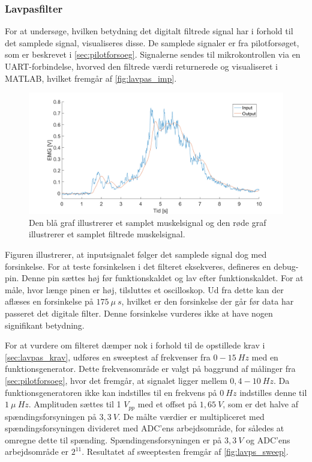 \subsubsection{Lavpasfilter} \label{sec:lavpas_test}
For at undersøge, hvilken betydning det digitalt filtrede signal har i forhold til det samplede signal, visualiseres disse. De samplede signaler er fra pilotforsøget, som er beskrevet i \autoref{sec:pilotforsoeg}. Signalerne sendes til mikrokontrollen via en UART-forbindelse, hvorved den filtrede værdi returnerede og visualiseret i MATLAB, hvilket fremgår af \autoref{fig:lavpas_imp}.

\begin{figure}[H]
\centering
\includegraphics[width=1\textwidth]{figures/EMG_test}
\caption{Den blå graf illustrerer et samplet muskelsignal og den røde graf illustrerer et samplet filtrede muskelsignal.}
\label{fig:lavpas_imp}
\end{figure}

\noindent
Figuren illustrerer, at inputsignalet følger det samplede signal dog med forsinkelse. For at teste forsinkelsen i det filteret eksekveres, defineres en debug-pin. Denne pin sættes høj før funktionskaldet og lav efter funktionskaldet. For at måle, hvor længe pinen er høj, tilsluttes et oscilloskop. Ud fra dette kan der aflæses en forsinkelse på $175~\mu~s$, hvilket er den forsinkelse der går før data har passeret det digitale filter. Denne forsinkelse vurderes ikke at have nogen signifikant betydning.

For at vurdere om filteret dæmper nok i forhold til de opstillede krav i \autoref{sec:lavpas_krav}, udføres en sweeptest af frekvenser fra $0-15~Hz$ med en funktionsgenerator. Dette frekvensområde er valgt på baggrund af målinger fra \autoref{sec:pilotforsoeg}, hvor det fremgår, at signalet ligger mellem $0,4-10~Hz$.  Da funktionsgeneratoren ikke kan indstilles til en frekvens på $0~Hz$ indstilles denne til $1~\mu~Hz$. Amplituden sættes til 1 $V_{pp}$ med et offset på $1,65~V$, som er det halve af spændingsforsyningen på $3,3~V$. De målte værdier er multipliceret med spændingsforsyningen divideret med ADC'ens arbejdsområde, for således at omregne dette til spænding. Spændingensforsyningen er på $3,3~V$ og ADC'ens arbejdsområde er $2^{11}$. Resultatet af sweeptesten fremgår af \autoref{fig:lavps_sweep}.

